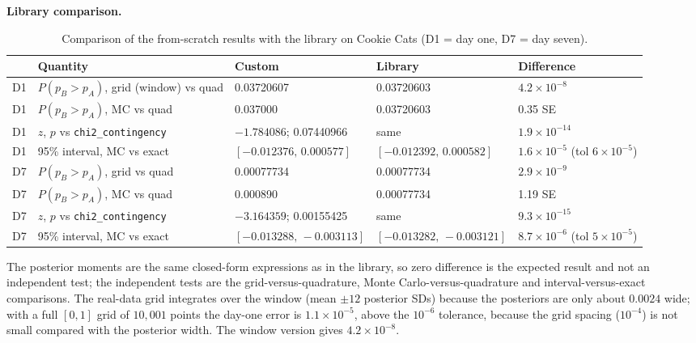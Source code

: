 \documentclass[11pt]{article}
\begin{document}
\textbf{Library comparison.}
\begin{table}[H]\centering\footnotesize
\caption{Comparison of the from-scratch results with the library on Cookie Cats (D1 = day one, D7 = day seven).}
\begin{tabular}{@{}l p{4.1cm} p{3.1cm} p{3.1cm} p{2.6cm}@{}}\toprule
 & Quantity & Custom & Library & Difference\\\midrule
D1 & $P(p_B>p_A)$, grid (window) vs quad & 0.03720607 & 0.03720603 & $4.2\times10^{-8}$\\
D1 & $P(p_B>p_A)$, MC vs quad & 0.037000 & 0.03720603 & 0.35 SE\\
D1 & $z$, $p$ vs \texttt{chi2\_contingency} & $-1.784086$; 0.07440966 & same & $1.9\times10^{-14}$\\
D1 & 95\% interval, MC vs exact & $[-0.012376,\,0.000577]$ & $[-0.012392,\,0.000582]$ & $1.6\times10^{-5}$ (tol $6\times10^{-5}$)\\
D7 & $P(p_B>p_A)$, grid vs quad & 0.00077734 & 0.00077734 & $2.9\times10^{-9}$\\
D7 & $P(p_B>p_A)$, MC vs quad & 0.000890 & 0.00077734 & 1.19 SE\\
D7 & $z$, $p$ vs \texttt{chi2\_contingency} & $-3.164359$; 0.00155425 & same & $9.3\times10^{-15}$\\
D7 & 95\% interval, MC vs exact & $[-0.013288,\,-0.003113]$ & $[-0.013282,\,-0.003121]$ & $8.7\times10^{-6}$ (tol $5\times10^{-5}$)\\\bottomrule
\end{tabular}
\end{table}
The posterior moments are the same closed-form expressions as in the library, so zero difference is the expected result and not an independent test; the independent tests are the grid-versus-quadrature, Monte Carlo-versus-quadrature and interval-versus-exact comparisons. The real-data grid integrates over the window (mean $\pm12$ posterior SDs) because the posteriors are only about $0.0024$ wide; with a full $[0,1]$ grid of $10{,}001$ points the day-one error is $1.1\times10^{-5}$, above the $10^{-6}$ tolerance, because the grid spacing ($10^{-4}$) is not small compared with the posterior width. The window version gives $4.2\times10^{-8}$.
\end{document}
